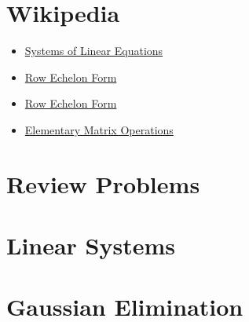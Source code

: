 \documentclass[12pt]{article}
\newcommand{\moduleinputProblems}[1]{}
\newcommand{\1}{{\mathrm 1\hspace*{-0.4ex}%
\rule{0.1ex}{1.52ex}\hspace*{0.2ex}}}
\begin{document}
\pagestyle{plain}






\tableofcontents









\newpage

\section*{Wikipedia}

\begin{itemize}
\item \href{http://en.wikipedia.org/wiki/System_of_linear_equations}{Systems of Linear Equations}

\item \href{http://en.wikipedia.org/wiki/Row_echelon_form}{Row Echelon Form}
 
\item \href{http://en.wikipedia.org/wiki/Row_echelon_form}{Row Echelon Form}

\item \href{http://en.wikipedia.org/wiki/Elementary_matrix_transformations}{Elementary Matrix Operations}
\end{itemize}


\newpage

\section*{Review Problems}

\section*{Linear Systems}

\moduleinputProblems{\whatIsPath/problems}

\newpage

\section*{Gaussian Elimination}
\end{document}

